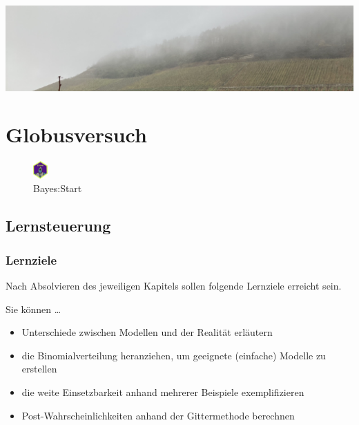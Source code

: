 \documentclass[
  a4paper,
  DIV=11]{scrreprt}
\providecommand{\tightlist}{%
  \setlength{\itemsep}{0pt}\setlength{\parskip}{0pt}}\usepackage{longtable,booktabs,array}
\theoremstyle{definition}
\theoremstyle{remark}
\begin{document}
\includegraphics[width=1\textwidth,height=\textheight]{./img/outro-04.jpg}


\hypertarget{globusversuch}{%
\chapter{Globusversuch}\label{globusversuch}}

\begin{figure}

{\centering \includegraphics[width=0.05\textwidth,height=\textheight]{./img/Golem_hex.png}

}

\caption{Bayes:Start}

\end{figure}

\hypertarget{lernsteuerung-3}{%
\section{Lernsteuerung}\label{lernsteuerung-3}}

\hypertarget{lernziele-4}{%
\subsection{Lernziele}\label{lernziele-4}}

Nach Absolvieren des jeweiligen Kapitels sollen folgende Lernziele
erreicht sein.

Sie können \ldots{}

\begin{itemize}
\tightlist
\item
  Unterschiede zwischen Modellen und der Realität erläutern
\item
  die Binomialverteilung heranziehen, um geeignete (einfache) Modelle zu
  erstellen
\item
  die weite Einsetzbarkeit anhand mehrerer Beispiele exemplifizieren
\item
  Post-Wahrscheinlichkeiten anhand der Gittermethode berechnen
\end{itemize}
\end{document}
